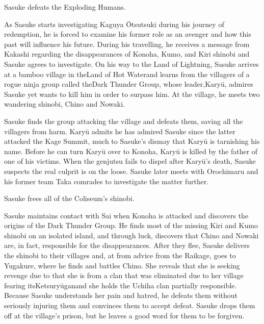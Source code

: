 \documentclass[a4paper,12pt]{article}
\begin{document}
Sasuke defeats the Exploding Humans.\\ \par \vspace{0.5cm}

As Sasuke starts investigating Kaguya Ōtsutsuki during his journey of redemption, he is forced to examine his former role as an avenger and how this past will influence his future. During his travelling, he receives a message from Kakashi regarding the disappearances of Konoha, Kumo, and Kiri shinobi and Sasuke agrees to investigate. On his way to the Land of Lightning, Sasuke arrives at a bamboo village in theLand of Hot Waterand learns from the villagers of a rogue ninja group called theDark Thunder Group, whose leader,Karyū, admires Sasuke yet wants to kill him in order to surpass him. At the village, he meets two wandering shinobi, Chino and Nowaki.\\ \par \vspace{0.5cm}

Sasuke finds the group attacking the village and defeats them, saving all the villagers from harm. Karyū admits he has admired Sasuke since the latter attacked the Kage Summit, much to Sasuke's dismay that Karyū is tarnishing his name. Before he can turn Karyū over to Konoha, Karyū is killed by the father of one of his victims. When the genjutsu fails to dispel after Karyū's death, Sasuke suspects the real culprit is on the loose. Sasuke later meets with Orochimaru and his former team Taka comrades to investigate the matter further.\\ \par \vspace{0.5cm}

Sasuke frees all of the Coliseum's shinobi.\\ \par \vspace{0.5cm}

Sasuke maintains contact with Sai when Konoha is attacked and discovers the origins of the Dark Thunder Group. He finds most of the missing Kiri and Kumo shinobi on an isolated island, and through luck, discovers that Chino and Nowaki are, in fact, responsible for the disappearances. After they flee, Sasuke delivers the shinobi to their villages and, at from advice from the Raikage, goes to Yugakure, where he finds and battles Chino. She reveals that she is seeking revenge due to that she is from a clan that was eliminated due to her village fearing itsKetsuryūganand she holds the Uchiha clan partially responsible. Because Sasuke understands her pain and hatred, he defeats them without seriously injuring them and convinces them to accept defeat. Sasuke drops them off at the village's prison, but he leaves a good word for them to be forgiven.\\ \par \vspace{0.5cm}
\end{document}
